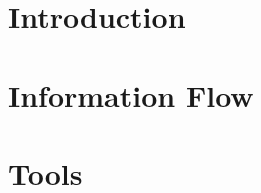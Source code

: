 \hypertarget{manual_manual_intro}{}\section{Introduction}\label{manual_manual_intro}
\hypertarget{manual_manual_flow}{}\section{Information Flow}\label{manual_manual_flow}
\hypertarget{manual_manual_tools}{}\section{Tools}\label{manual_manual_tools}
